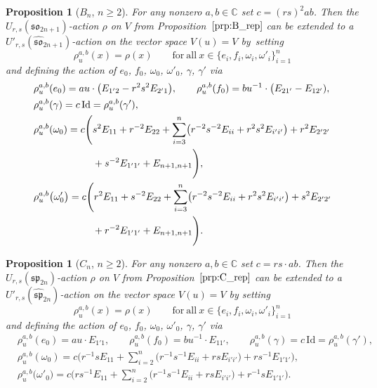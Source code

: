 \documentclass[pdftex]{sigma}
\numberwithin{equation}{section}
\newtheorem{Proposition}[Theorem]{Proposition}
 { \theoremstyle{definition}
\newtheorem{Definition}[Theorem]{Definition}
\newtheorem{Note}[Theorem]{Note}
\newtheorem{Example}[Theorem]{Example}
\newtheorem{Remark}[Theorem]{Remark} }
\newcommand{\BC}{\mathbb{C}}
\newcommand{\sso}{\mathfrak{so}}
\newcommand{\ssp}{\mathfrak{sp}}
\newcommand{\Id}{\mathrm{Id}}
\begin{document}
\begin{Proposition}[$B_n$, $n\geq 2$]\label{prop:B_aff_rep}
For any nonzero $a,b\in \BC$ set $c=(rs)^2 ab$. Then the $U_{r,s}(\sso_{2n+1})$-action $\rho$ on $V$ from Proposition~$\ref{prp:B_rep}$ can be extended to a $U'_{r,s}(\widehat{\sso}_{2n+1})$-action  on the vector space $V(u)=V$ by~setting
\begin{displaymath}
 \rho^{a,b}_u(x)=\rho(x) \qquad \mathrm{for\ all} \ x\in \bigl\{e_i,f_i,\omega_i,\omega'_i\bigr\}_{i=1}^{n}
\end{displaymath}
and defining the action of $e_0$, $f_0$, $\omega_0$, $\omega'_0$, $\gamma$, $\gamma'$ via
\begin{align*}
 & \rho^{a,b}_u(e_0)=au \cdot \bigl(E_{1' 2} - r^2s^2 E_{2' 1} \bigr), \qquad
 \rho^{a,b}_u(f_0)=bu^{-1} \cdot \bigl(E_{2 1'}-E_{1 2'}), \\
 &\rho^{a,b}_u(\gamma)=c \,\Id=\rho^{a,b}_u(\gamma') , \\
 & \rho^{a,b}_u(\omega_0)=
 c\Biggl( s^2E_{11}+r^{-2}E_{22}+\sum_{i=3}^{n} \bigl( r^{-2}s^{-2}E_{ii} + r^2s^2 E_{i'i'}\bigr) +
 r^2E_{2' 2'} \\
 & \hphantom{\rho^{a,b}_u(\omega_0)=c\Biggl(}{}
 + s^{-2}E_{1' 1'} + E_{n+1,n+1} \Biggr), \\
 & \rho^{a,b}_u\big(\omega'_0\big)=
 c\Biggl( r^2E_{11}+s^{-2}E_{22}+\sum_{i=3}^{n} \bigl( r^{-2}s^{-2}E_{ii} + r^2s^2 E_{i'i'}\bigr) +s^2E_{2' 2'}\\
 & \hphantom{\rho^{a,b}_u(\omega'_0)=c\Biggl(}{}
 + r^{-2}E_{1' 1'}+E_{n+1,n+1} \Biggr).
\end{align*}
\end{Proposition}

\begin{Proposition}[$C_n$, $n\geq 2$]\label{prop:C_aff_rep}
For any nonzero $a,b\in \BC$ set $c=rs\cdot ab$. Then the $U_{r,s}(\ssp_{2n})$-action $\rho$ on $V$ from Proposition~$\ref{prp:C_rep}$ can be extended to a $U'_{r,s}(\widehat{\ssp}_{2n})$-action  on the vector space $V(u)=V$ by setting
\begin{displaymath}
 \rho^{a,b}_u(x)=\rho(x) \qquad \mathrm{for\ all} \ x\in \bigl\{e_i,f_i,\omega_i,\omega'_i\bigr\}_{i=1}^{n}
\end{displaymath}
and defining the action of $e_0$, $f_0$, $\omega_0$, $\omega'_0$, $\gamma$, $\gamma'$ via
\begin{displaymath}
\begin{split}
 & \rho^{a,b}_u(e_0)=au \cdot E_{1' 1}, \qquad \rho^{a,b}_u(f_0)=bu^{-1} \cdot E_{1 1'}, \qquad
 \rho^{a,b}_u(\gamma)=c\, \Id=\rho^{a,b}_u(\gamma'),\\
 & \rho^{a,b}_u(\omega_0)=
 c\Biggl( r^{-1}sE_{11}+\sum_{i=2}^{n} \bigl( r^{-1}s^{-1}E_{ii} + rs E_{i'i'}\bigr) + rs^{-1}E_{1' 1'} \Biggr), \\
 & \rho^{a,b}_u\big(\omega'_0\big)=
 c\Biggl( rs^{-1}E_{11}+\sum_{i=2}^{n} \bigl( r^{-1}s^{-1}E_{ii} + rs E_{i'i'}\bigr) + r^{-1}sE_{1' 1'} \Biggr).
\end{split}
\end{displaymath}
\end{Proposition}
\end{document}
